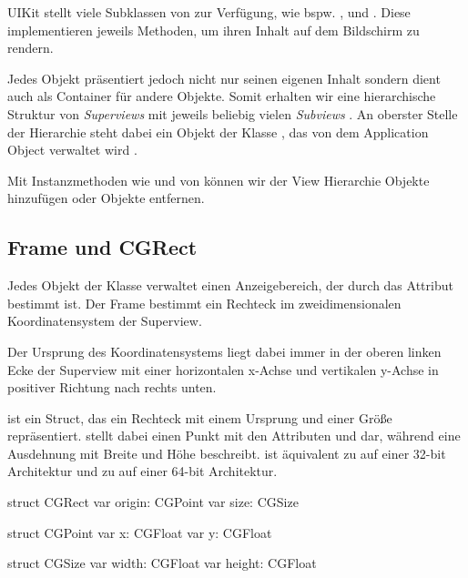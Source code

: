 \documentclass[parskip=half, final]{scrreprt}
\begin{document}
UIKit stellt viele Subklassen von  zur Verfügung, wie bspw. ,  und . Diese implementieren jeweils Methoden, um ihren Inhalt auf dem Bildschirm zu rendern.

Jedes  Objekt präsentiert jedoch nicht nur seinen eigenen Inhalt sondern dient auch als Container für andere  Objekte. Somit erhalten wir eine hierarchische Struktur von \emph{Superviews} mit jeweils beliebig vielen \emph{Subviews} . An oberster Stelle der Hierarchie steht dabei ein Objekt der Klasse , das von dem Application Object verwaltet wird .


Mit Instanzmethoden wie  und  von  können wir der View Hierarchie Objekte hinzufügen oder Objekte entfernen.

\subsection{Frame und CGRect}

Jedes Objekt der Klasse  verwaltet einen Anzeigebereich, der durch das Attribut  bestimmt ist. Der Frame bestimmt ein Rechteck im zweidimensionalen Koordinatensystem der Superview.

Der Ursprung des Koordinatensystems liegt dabei immer in der oberen linken Ecke der Superview  mit einer horizontalen x-Achse und vertikalen y-Achse in positiver Richtung nach rechts unten.


 ist ein Struct, das ein Rechteck mit einem Ursprung  und einer Größe  repräsentiert.  stellt dabei einen Punkt mit den Attributen  und  dar, während  eine Ausdehnung mit Breite  und Höhe  beschreibt.  ist äquivalent zu  auf einer 32-bit Architektur und zu  auf einer 64-bit Architektur.
\begin{swiftcode}
struct CGRect {
   var origin: CGPoint
   var size: CGSize
}

struct CGPoint {
   var x: CGFloat
   var y: CGFloat
}
 
struct CGSize {
   var width: CGFloat
   var height: CGFloat
}
\end{swiftcode}
\end{document}
